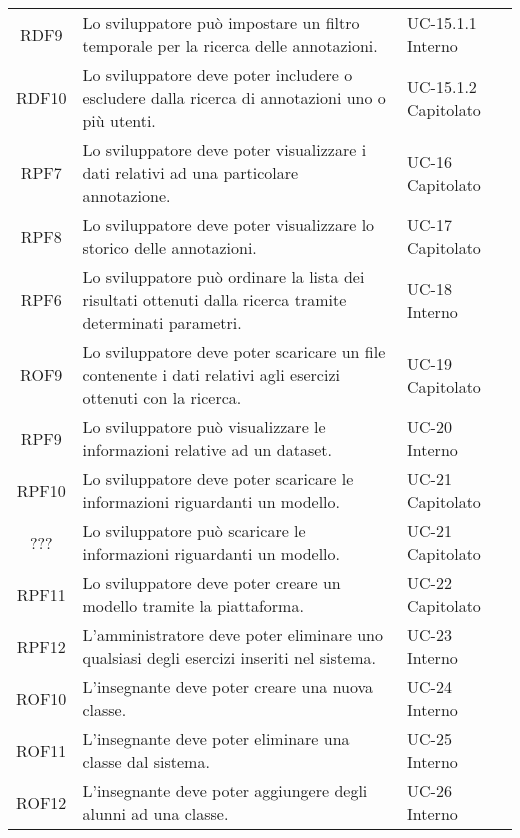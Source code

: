 \begin{tabularx}{\textwidth}{| c | p{10cm} | X |}
		RDF9 & Lo sviluppatore può impostare un filtro temporale per la ricerca delle annotazioni. & UC-15.1.1 \newline Interno\\
		RDF10 &  Lo sviluppatore deve poter includere o escludere dalla ricerca di annotazioni uno o più utenti. & UC-15.1.2 \newline Capitolato\\
		RPF7 & Lo sviluppatore deve poter visualizzare i dati relativi ad una particolare annotazione. & UC-16 \newline Capitolato\\
		RPF8 & Lo sviluppatore deve poter visualizzare lo storico delle annotazioni. & UC-17 \newline Capitolato\\
		RPF6 & Lo sviluppatore può ordinare la lista dei risultati ottenuti dalla ricerca tramite determinati parametri. & UC-18 \newline Interno\\	
		ROF9 & Lo sviluppatore deve poter scaricare un file contenente i dati relativi agli esercizi ottenuti con la ricerca. & UC-19 \newline Capitolato\\
		RPF9 & Lo sviluppatore può visualizzare le informazioni relative ad un dataset. & UC-20 \newline Interno\\
		RPF10 & Lo sviluppatore deve poter scaricare le informazioni riguardanti un modello. & UC-21 \newline Capitolato\\
		??? & Lo sviluppatore può scaricare le informazioni riguardanti un modello. & UC-21 \newline Capitolato\\
		RPF11 & Lo sviluppatore deve poter creare un modello tramite la piattaforma. & UC-22 \newline Capitolato\\ 
		RPF12 & L'amministratore deve poter eliminare uno qualsiasi degli esercizi inseriti nel sistema. & UC-23 \newline Interno\\
		ROF10 & L'insegnante deve poter creare una nuova classe. & UC-24 \newline Interno\\
		ROF11 & L'insegnante deve poter eliminare una classe dal sistema. & UC-25 \newline Interno\\
		ROF12 & L'insegnante deve poter aggiungere degli alunni ad una classe. & UC-26 \newline Interno\\

\end{tabularx}
